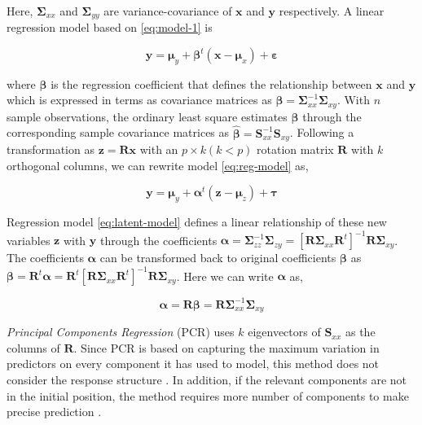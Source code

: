 \documentclass[12pt,3p,authoryear]{elsarticle}
\begin{document}
Here, \(\boldsymbol{\Sigma}_{xx}\) and \(\boldsymbol{\Sigma}_{yy}\) are
variance-covariance of \(\mathbf{x}\) and \(\mathbf{y}\) respectively. A linear regression model based on \eqref{eq:model-1} is

\begin{equation}
\mathbf{y} = \boldsymbol{\mu}_y + \boldsymbol{\beta}^t\left( \mathbf{x} - \boldsymbol{\mu}_{x} \right) + \boldsymbol{\varepsilon}
\label{eq:reg-model}
\end{equation}

where \(\boldsymbol{\beta}\) is the regression coefficient that defines the relationship between \(\mathbf{x}\) and \(\mathbf{y}\) which is expressed in terms as covariance matrices as \(\boldsymbol{\beta} = \boldsymbol{\Sigma}_{xx}^{-1}\boldsymbol{\Sigma}_{xy}\). With \(n\) sample observations, the ordinary least square estimates \(\boldsymbol{\beta}\) through the corresponding sample covariance matrices as \(\boldsymbol{\hat{\beta}} = \mathbf{S}_{xx}^{-1}\mathbf{S}_{xy}\). Following a transformation as \(\mathbf{z} = \mathbf{Rx}\) with an \(p \times k (k<p)\) rotation matrix \(\mathbf{R}\) with \(k\) orthogonal columns, we can rewrite model \eqref{eq:reg-model} as,

\begin{equation}
\mathbf{y} = \boldsymbol{\mu}_y + \boldsymbol{\alpha}^t\left( \mathbf{z} - \boldsymbol{\mu}_{z} \right) + \boldsymbol{\tau}
\label{eq:latent-model}
\end{equation}

Regression model \eqref{eq:latent-model} defines a linear relationship of these new variables \(\mathbf{z}\) with \(\mathbf{y}\) through the coefficients \(\boldsymbol{\alpha} = \boldsymbol{\Sigma}_{zz}^{-1}\boldsymbol{\Sigma}_{zy} = \left[\mathbf{R}\boldsymbol{\Sigma}_{xx}\mathbf{R}^t\right]^{-1}\mathbf{R}\boldsymbol{\Sigma}_{xy}\). The coefficients \(\boldsymbol{\alpha}\) can be transformed back to original coefficients \(\boldsymbol{\beta}\) as \(\boldsymbol{\beta} = \mathbf{R}^t \boldsymbol{\alpha} = \mathbf{R}^t\left[\mathbf{R}\boldsymbol{\Sigma}_{xx}\mathbf{R}^t\right]^{-1}\mathbf{R}\boldsymbol{\Sigma}_{xy}\). Here we can write \(\boldsymbol{\alpha}\) as,

\[\boldsymbol{\alpha} = \mathbf{R} \boldsymbol{\beta} = \mathbf{R} \boldsymbol{\Sigma}_{xx}^{-1}\boldsymbol{\Sigma}_{xy} \]

\emph{Principal Components Regression} (PCR) uses \(k\) eigenvectors of \(\mathbf{S}_{xx}\) as the columns of \(\mathbf{R}\). Since PCR is based on capturing the maximum variation in predictors on every component it has used to model, this method does not consider the response structure \citep{Jolliffe2002}. In addition, if the relevant components are not in the initial position, the method requires more number of components to make precise prediction \citep{Alm_y_1996}.
\end{document}
